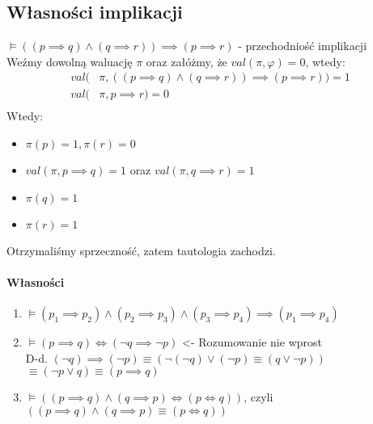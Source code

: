 \documentclass{article}
\theoremstyle{definition}
\theoremstyle{definition}
\theoremstyle{definition}
\theoremstyle{definition}
\begin{document}
\subsection{Własności implikacji}
$\models ((p\implies q)\land (q\implies r)) \implies (p\implies r)$ - przechodniość implikacji\\
Weźmy dowolną waluację $\pi$ oraz załóżmy, że $val(\pi,\varphi)=0$, wtedy:
\begin{align*}
val(&\pi,((p\implies q)\land (q\implies r)) \implies (p\implies r))=1\\
val(&\pi,p\implies r)=0\\
\end{align*}
Wtedy:
\begin{itemize}
    \item $\pi(p)=1, \pi(r)=0$
    \item $val(\pi, p\implies q)=1$ oraz $val(\pi, q\implies r)=1$
    \item $\pi(q)=1$
    \item $\pi(r)=1$
\end{itemize}
Otrzymaliśmy sprzeczność, zatem tautologia zachodzi.

\paragraph{Własności}
\begin{enumerate}
    \item $\models (p_1\implies p_2)\land(p_2\implies p_3)\land (p_3\implies p_4)\implies (p_1\implies p_4)$
    \item $\models (p\implies q) \iff (\neg q\implies \neg p)$ <- Rozumowanie nie wprost\\
    D-d. $(\neg q)\implies (\neg p) \equiv  (\neg(\neg q)\lor (\neg p) \equiv (q\lor \neg p))$\\
    $\equiv (\neg p\lor q)\equiv(p\implies q)$
    \item $\models ((p\implies q)\land (q\implies p) \iff (p\iff q))$, czyli\\
    $((p\implies q)\land (q\implies p) \equiv (p\iff q))$
\end{enumerate}
\end{document}
